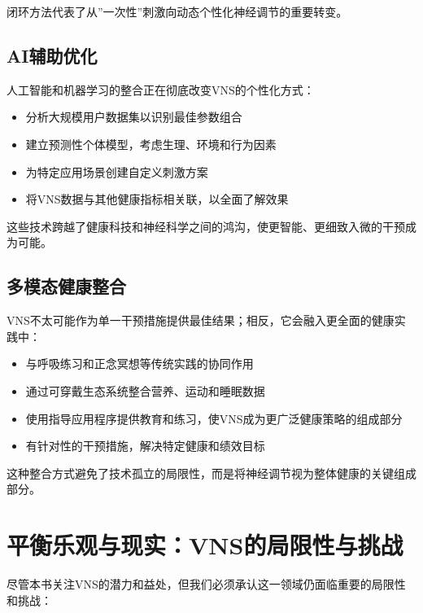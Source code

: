 \documentclass[
  Letterpaper,
]{scrbook}
\providecommand{\tightlist}{%
  \setlength{\itemsep}{0pt}\setlength{\parskip}{0pt}}\usepackage{longtable,booktabs,array}
\begin{document}
闭环方法代表了从''一次性''刺激向动态个性化神经调节的重要转变。

\subsection{AI辅助优化}\label{aiux8f85ux52a9ux4f18ux5316}

人工智能和机器学习的整合正在彻底改变VNS的个性化方式：

\begin{itemize}
\tightlist
\item
  分析大规模用户数据集以识别最佳参数组合
\item
  建立预测性个体模型，考虑生理、环境和行为因素
\item
  为特定应用场景创建自定义刺激方案
\item
  将VNS数据与其他健康指标相关联，以全面了解效果
\end{itemize}

这些技术跨越了健康科技和神经科学之间的鸿沟，使更智能、更细致入微的干预成为可能。

\subsection{多模态健康整合}\label{ux591aux6a21ux6001ux5065ux5eb7ux6574ux5408}

VNS不太可能作为单一干预措施提供最佳结果；相反，它会融入更全面的健康实践中：

\begin{itemize}
\tightlist
\item
  与呼吸练习和正念冥想等传统实践的协同作用
\item
  通过可穿戴生态系统整合营养、运动和睡眠数据
\item
  使用指导应用程序提供教育和练习，使VNS成为更广泛健康策略的组成部分
\item
  有针对性的干预措施，解决特定健康和绩效目标
\end{itemize}

这种整合方式避免了技术孤立的局限性，而是将神经调节视为整体健康的关键组成部分。

\section{平衡乐观与现实：VNS的局限性与挑战}\label{ux5e73ux8861ux4e50ux89c2ux4e0eux73b0ux5b9evnsux7684ux5c40ux9650ux6027ux4e0eux6311ux6218}

尽管本书关注VNS的潜力和益处，但我们必须承认这一领域仍面临重要的局限性和挑战：
\end{document}
